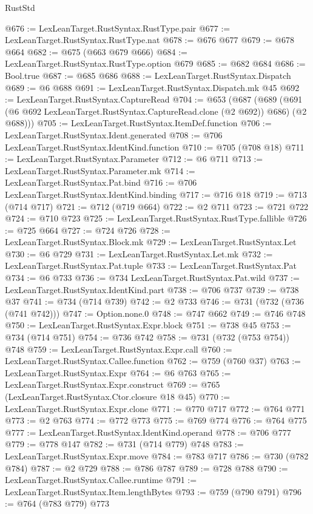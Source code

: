 \begin{lexlean}{RustStd}
\begin{coremodule}
@676 := LexLeanTarget.RustSyntax.RustType.pair
@677 := LexLeanTarget.RustSyntax.RustType.nat
@678 := @676 @677
@679 := @678 @664
@682 := @675 (@663 @679 @666)
@684 := LexLeanTarget.RustSyntax.RustType.option @679
@685 := @682 @684
@686 := Bool.true
@687 := @685 @686
@688 := LexLeanTarget.RustSyntax.Dispatch
@689 := @6 @688
@691 := LexLeanTarget.RustSyntax.Dispatch.mk @45
@692 := LexLeanTarget.RustSyntax.CaptureRead
@704 := @653
    (@687
      (@689 (@691 (@6 @692 LexLeanTarget.RustSyntax.CaptureRead.clone (@2 @692)) @686) (@2 @688)))
@705 := LexLeanTarget.RustSyntax.ItemDef.function
@706 := LexLeanTarget.RustSyntax.Ident.generated
@708 := @706 LexLeanTarget.RustSyntax.IdentKind.function
@710 := @705 (@708 @18)
@711 := LexLeanTarget.RustSyntax.Parameter
@712 := @6 @711
@713 := LexLeanTarget.RustSyntax.Parameter.mk
@714 := LexLeanTarget.RustSyntax.Pat.bind
@716 := @706 LexLeanTarget.RustSyntax.IdentKind.binding
@717 := @716 @18
@719 := @713 (@714 @717)
@721 := @712 (@719 @664)
@722 := @2 @711
@723 := @721 @722
@724 := @710 @723
@725 := LexLeanTarget.RustSyntax.RustType.fallible
@726 := @725 @664
@727 := @724 @726
@728 := LexLeanTarget.RustSyntax.Block.mk
@729 := LexLeanTarget.RustSyntax.Let
@730 := @6 @729
@731 := LexLeanTarget.RustSyntax.Let.mk
@732 := LexLeanTarget.RustSyntax.Pat.tuple
@733 := LexLeanTarget.RustSyntax.Pat
@734 := @6 @733
@736 := @734 LexLeanTarget.RustSyntax.Pat.wild
@737 := LexLeanTarget.RustSyntax.IdentKind.part
@738 := @706 @737
@739 := @738 @37
@741 := @734 (@714 @739)
@742 := @2 @733
@746 := @731 (@732 (@736 (@741 @742)))
@747 := Option.none.{0}
@748 := @747 @662
@749 := @746 @748
@750 := LexLeanTarget.RustSyntax.Expr.block
@751 := @738 @45
@753 := @734 (@714 @751)
@754 := @736 @742
@758 := @731 (@732 (@753 @754)) @748
@759 := LexLeanTarget.RustSyntax.Expr.call
@760 := LexLeanTarget.RustSyntax.Callee.function
@762 := @759 (@760 @37)
@763 := LexLeanTarget.RustSyntax.Expr
@764 := @6 @763
@765 := LexLeanTarget.RustSyntax.Expr.construct
@769 := @765 (LexLeanTarget.RustSyntax.Ctor.closure @18 @45)
@770 := LexLeanTarget.RustSyntax.Expr.clone
@771 := @770 @717
@772 := @764 @771
@773 := @2 @763
@774 := @772 @773
@775 := @769 @774
@776 := @764 @775
@777 := LexLeanTarget.RustSyntax.IdentKind.operand
@778 := @706 @777
@779 := @778 @147
@782 := @731 (@714 @779) @748
@783 := LexLeanTarget.RustSyntax.Expr.move
@784 := @783 @717
@786 := @730 (@782 @784)
@787 := @2 @729
@788 := @786 @787
@789 := @728 @788
@790 := LexLeanTarget.RustSyntax.Callee.runtime
@791 := LexLeanTarget.RustSyntax.Item.lengthBytes
@793 := @759 (@790 @791)
@796 := @764 (@783 @779) @773

\end{coremodule}
\end{lexlean}
